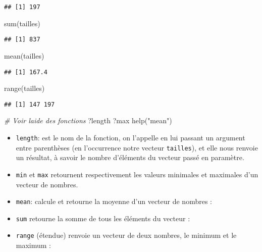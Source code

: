 \documentclass[
]{article}
\newenvironment{Shaded}{\begin{snugshade}}{\end{snugshade}}
\newcommand{\CommentTok}[1]{\textcolor[rgb]{0.56,0.35,0.01}{\textit{#1}}}
\newcommand{\FunctionTok}[1]{\textcolor[rgb]{0.00,0.00,0.00}{#1}}
\newcommand{\NormalTok}[1]{#1}
\newcommand{\StringTok}[1]{\textcolor[rgb]{0.31,0.60,0.02}{#1}}
\begin{document}
\begin{verbatim}
## [1] 197
\end{verbatim}

\begin{Shaded}
\begin{Highlighting}[]
\FunctionTok{sum}\NormalTok{(tailles)}
\end{Highlighting}
\end{Shaded}

\begin{verbatim}
## [1] 837
\end{verbatim}

\begin{Shaded}
\begin{Highlighting}[]
\FunctionTok{mean}\NormalTok{(tailles)}
\end{Highlighting}
\end{Shaded}

\begin{verbatim}
## [1] 167.4
\end{verbatim}

\begin{Shaded}
\begin{Highlighting}[]
\FunctionTok{range}\NormalTok{(tailles)}
\end{Highlighting}
\end{Shaded}

\begin{verbatim}
## [1] 147 197
\end{verbatim}

\begin{Shaded}
\begin{Highlighting}[]
\CommentTok{\# Voir l\textquotesingle{}aide des fonctions}
\NormalTok{?length}
\NormalTok{?max}
\FunctionTok{help}\NormalTok{(}\StringTok{"mean"}\NormalTok{)}
\end{Highlighting}
\end{Shaded}

\begin{itemize}
\item
  \texttt{length}: est le nom de la fonction, on l'appelle en lui
  passant un argument entre parenthèses (en l'occurrence notre vecteur
  \texttt{tailles}), et elle nous renvoie un résultat, à savoir le
  nombre d'éléments du vecteur passé en paramètre.
\item
  \texttt{min} et \texttt{max} retournent respectivement les valeurs
  minimales et maximales d'un vecteur de nombres.
\item
  \texttt{mean}: calcule et retourne la moyenne d'un vecteur de nombres
  :
\item
  \texttt{sum} retourne la somme de tous les éléments du vecteur :
\item
  \texttt{range} (étendue) renvoie un vecteur de deux nombres, le
  minimum et le maximum :
\end{itemize}
\end{document}

